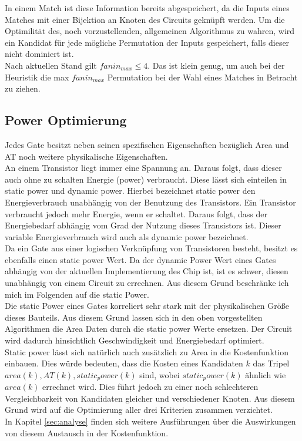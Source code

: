 \documentclass[11pt, a4paper, german]{article}
\begin{document}
In einem Match ist diese Information bereits abgespeichert, da die Inputs eines Matches mit einer Bijektion an Knoten des Circuits geknüpft werden. Um die Optimilität des, noch vorzustellenden, allgemeinen Algorithmus zu wahren, wird ein Kandidat für jede mögliche Permutation der Inputs gespeichert, falls dieser nicht dominiert ist.\\
Nach aktuellen Stand gilt $fanin_{max} \leq 4$. Das ist klein genug, um auch bei der Heuristik die max $fanin_{max}$ Permutation bei der Wahl eines Matches in Betracht zu ziehen. 

\subsection{Power Optimierung}
Jedes Gate besitzt neben seinen spezifischen Eigenschaften bezüglich Area und AT noch weitere physikalische Eigenschaften.\\
An einem Transistor liegt immer eine Spannung an. Daraus folgt, dass dieser auch ohne zu schalten Energie (power) verbraucht. Diese lässt sich einteilen in static power und dynamic power. Hierbei bezeichnet static power den Energieverbrauch unabhängig von der Benutzung des Transistors. Ein Transistor verbraucht jedoch mehr Energie, wenn er schaltet. Daraus folgt, dass der Energiebedarf abhängig vom Grad der Nutzung dieses Transistors ist. Dieser variable Energieverbrauch wird auch als dynamic power bezeichnet.\\
Da ein Gate aus einer logischen Verknüpfung von Transistoren besteht, besitzt es ebenfalls einen static power Wert. Da der dynamic Power Wert eines Gates abhängig von der aktuellen Implementierung des Chip ist, ist es schwer, diesen unabhängig von einem Circuit zu errechnen. Aus diesem Grund beschränke ich mich im Folgenden auf die static Power. \\
Die static Power eines Gates korreliert sehr stark mit der physikalischen Größe dieses Bauteils. Aus diesem Grund lassen sich in den oben vorgestellten Algorithmen die Area Daten durch die static power Werte ersetzen. Der Circuit wird dadurch hinsichtlich Geschwindigkeit und Energiebedarf optimiert. \\
Static power lässt sich natürlich auch zusätzlich zu Area in die Kostenfunktion einbauen. Dies würde bedeuten, dass die Kosten eines Kandidaten $k$ das Tripel $area(k), AT(k), static_power(k)$ sind, wobei $static_power(k)$ ähnlich wie $area(k)$ errechnet wird. Dies führt jedoch zu einer noch schlechteren Vergleichbarkeit von Kandidaten gleicher und verschiedener Knoten. Aus diesem Grund wird auf die Optimierung aller drei Kriterien zusammen verzichtet. \\
In Kapitel \ref{sec:analyse} finden sich weitere Ausführungen über die Auswirkungen von diesem Austausch in der Kostenfunktion.
	
\end{document}
